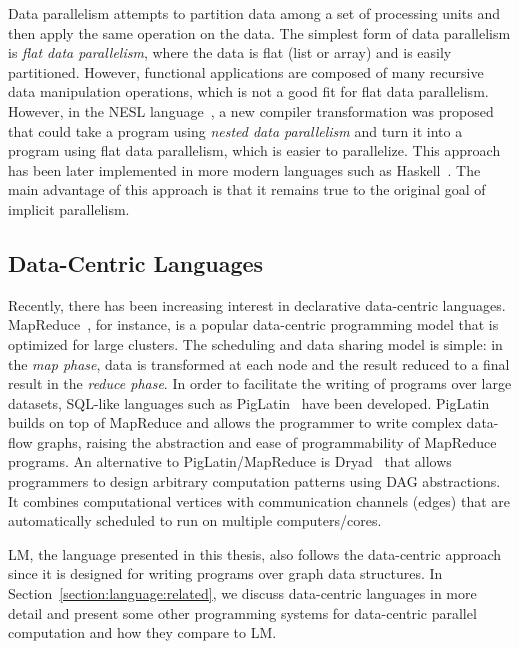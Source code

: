 Data parallelism attempts to partition data among a set of processing units and
then apply the same operation on the data. The simplest form of data parallelism
is \emph{flat data parallelism}, where the data is flat (list or array) and is
easily partitioned. However, functional applications are composed of many recursive
data manipulation operations, which is not a good fit for flat data parallelism.
However, in the NESL language~\cite{Blelloch:1996:PPA:227234.227246}, a new compiler
transformation was proposed that could take a program using \emph{nested data
parallelism} and turn it into a program using flat data parallelism, which is
easier to parallelize. This approach has been later implemented in more
modern languages such as Haskell~\cite{Chakravarty07dataparallel}. The main
advantage of this approach is that it remains true to the original goal of
implicit parallelism.

\subsection{Data-Centric Languages}

Recently, there has been increasing interest in declarative data-centric
languages. MapReduce~\cite{Dean:2008:MSD:1327452.1327492}, for instance, is a
popular data-centric programming model that is optimized for large clusters. The
scheduling and data sharing model is simple: in the \emph{map phase}, data
is transformed at each node and the result reduced to a final result in the
\emph{reduce phase}. In order to facilitate the writing of programs over large
datasets, SQL-like languages such as
PigLatin~\cite{Olston:2008:PLN:1376616.1376726} have been developed. PigLatin
builds on top of MapReduce and allows the programmer to write complex data-flow
graphs, raising the abstraction and ease of programmability of MapReduce
programs. An alternative to PigLatin/MapReduce is
Dryad~\cite{Isard:2007:DDD:1272996.1273005} that allows programmers to design
arbitrary computation patterns using DAG abstractions. It combines computational
vertices with communication channels (edges) that are automatically scheduled to
run on multiple computers/cores.

LM, the language presented in this thesis, also follows the data-centric
approach since it is designed for writing programs over graph data structures.
In Section~\ref{section:language:related}, we discuss data-centric languages in
more detail and present some other programming systems for data-centric parallel
computation and how they compare to LM.

